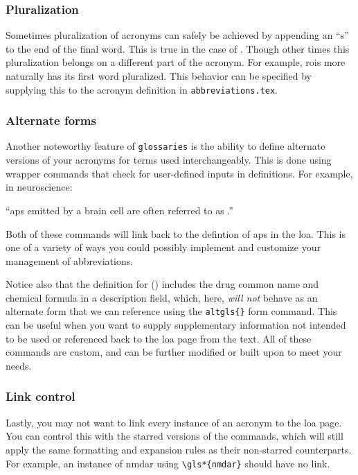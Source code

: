 \documentclass[../../main.tex]{subfiles}  %
\begin{document}
	\subsubsection{Pluralization}

	Sometimes pluralization of acronyms can safely be achieved by appending an ``s'' to the end of the final word.
	This is true in the case of . 
	Though other times this pluralization belongs on a different part of the acronym.
	For example, \glspl{roi} more naturally has its first word pluralized. 
	This behavior can be specified by supplying this to the acronym definition in \texttt{abbreviations.tex}.
	

	\subsubsection{Alternate forms}

	Another noteworthy feature of \verb|glossaries| is the ability to define alternate versions of your acronyms for terms used interchangeably.
	This is done using wrapper commands that check for user-defined inputs in definitions.
	For example, in neuroscience: 
	
	\begin{displayquote}
		``\glspl{ap} emitted by a brain cell are often referred to as .''
	\end{displayquote}

	Both of these commands will link back to the defintion of \glspl{ap} in the \gls{loa}.
	This is one of a variety of ways you could possibly implement and customize your management of abbreviations.

	Notice also that the definition for  () includes the drug common name and chemical formula in a description field, which, here, \textit{will not} behave as an alternate form that we can reference using the \verb|altgls{}| form command.
	This can be useful when you want to supply supplementary information not intended to be used or referenced back to the \gls{loa} page from the text.
	All of these commands are custom, and can be further modified or built upon to meet your needs.

	\subsubsection{Link control}

	Lastly, you may not want to link every instance of an acronym to the \gls{loa} page.
	You can control this with the starred versions of the commands, which will still apply the same formatting and expansion rules as their non-starred counterparts.
	For example, an instance of \gls*{nmdar} using \verb|\gls*{nmdar}| should have no link.
\end{document}
